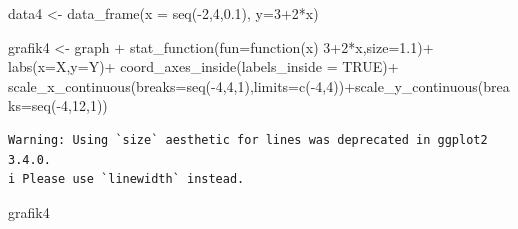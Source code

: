 \documentclass[
  letterpaper,
  DIV=11,
  numbers=noendperiod]{scrartcl}
\newenvironment{Shaded}{\begin{snugshade}}{\end{snugshade}}
\newcommand{\AttributeTok}[1]{\textcolor[rgb]{0.40,0.45,0.13}{#1}}
\newcommand{\ConstantTok}[1]{\textcolor[rgb]{0.56,0.35,0.01}{#1}}
\newcommand{\ControlFlowTok}[1]{\textcolor[rgb]{0.00,0.23,0.31}{#1}}
\newcommand{\DecValTok}[1]{\textcolor[rgb]{0.68,0.00,0.00}{#1}}
\newcommand{\FloatTok}[1]{\textcolor[rgb]{0.68,0.00,0.00}{#1}}
\newcommand{\FunctionTok}[1]{\textcolor[rgb]{0.28,0.35,0.67}{#1}}
\newcommand{\NormalTok}[1]{\textcolor[rgb]{0.00,0.23,0.31}{#1}}
\newcommand{\OtherTok}[1]{\textcolor[rgb]{0.00,0.23,0.31}{#1}}
\newcommand{\SpecialCharTok}[1]{\textcolor[rgb]{0.37,0.37,0.37}{#1}}
\newcommand{\StringTok}[1]{\textcolor[rgb]{0.13,0.47,0.30}{#1}}
\begin{document}
\begin{Shaded}
\begin{Highlighting}[]
\NormalTok{data4 }\OtherTok{\textless{}{-}} \FunctionTok{data\_frame}\NormalTok{(}\AttributeTok{x =} \FunctionTok{seq}\NormalTok{(}\SpecialCharTok{{-}}\DecValTok{2}\NormalTok{,}\DecValTok{4}\NormalTok{,}\FloatTok{0.1}\NormalTok{),}
                    \AttributeTok{y=}\DecValTok{3}\SpecialCharTok{+}\DecValTok{2}\SpecialCharTok{*}\NormalTok{x)}
                          
\NormalTok{grafik4 }\OtherTok{\textless{}{-}}\NormalTok{ graph }\SpecialCharTok{+}
  \FunctionTok{stat\_function}\NormalTok{(}\AttributeTok{fun=}\ControlFlowTok{function}\NormalTok{(x) }\DecValTok{3}\SpecialCharTok{+}\DecValTok{2}\SpecialCharTok{*}\NormalTok{x,}\AttributeTok{size=}\FloatTok{1.1}\NormalTok{)}\SpecialCharTok{+}
  \FunctionTok{labs}\NormalTok{(}\AttributeTok{x=}\StringTok{\textquotesingle{}X\textquotesingle{}}\NormalTok{,}\AttributeTok{y=}\StringTok{\textquotesingle{}Y\textquotesingle{}}\NormalTok{)}\SpecialCharTok{+}
  \FunctionTok{coord\_axes\_inside}\NormalTok{(}\AttributeTok{labels\_inside =} \ConstantTok{TRUE}\NormalTok{)}\SpecialCharTok{+}
  \FunctionTok{scale\_x\_continuous}\NormalTok{(}\AttributeTok{breaks=}\FunctionTok{seq}\NormalTok{(}\SpecialCharTok{{-}}\DecValTok{4}\NormalTok{,}\DecValTok{4}\NormalTok{,}\DecValTok{1}\NormalTok{),}\AttributeTok{limits=}\FunctionTok{c}\NormalTok{(}\SpecialCharTok{{-}}\DecValTok{4}\NormalTok{,}\DecValTok{4}\NormalTok{))}\SpecialCharTok{+}\FunctionTok{scale\_y\_continuous}\NormalTok{(}\AttributeTok{breaks=}\FunctionTok{seq}\NormalTok{(}\SpecialCharTok{{-}}\DecValTok{4}\NormalTok{,}\DecValTok{12}\NormalTok{,}\DecValTok{1}\NormalTok{))}
\end{Highlighting}
\end{Shaded}

\begin{verbatim}
Warning: Using `size` aesthetic for lines was deprecated in ggplot2 3.4.0.
i Please use `linewidth` instead.
\end{verbatim}

\begin{Shaded}
\begin{Highlighting}[]
\NormalTok{grafik4}
\end{Highlighting}
\end{Shaded}
\end{document}
